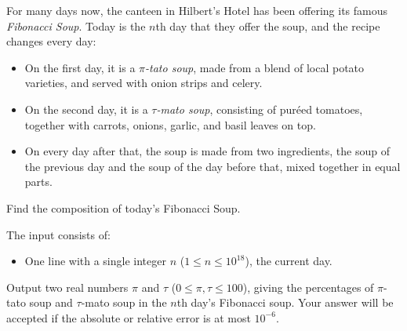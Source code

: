 
For many days now, the canteen in Hilbert's Hotel has been offering its famous
\emph{Fibonacci Soup}. Today is the $n$th day that they offer the soup, and the
recipe changes every day:

\begin{itemize}
  \item On the first day, it is a \emph{$\pi$-tato soup}, made from a blend of local
    potato varieties, and served with onion strips and celery.
  \item On the second day, it is a \emph{$\tau$-mato soup}, consisting of
    pur\'eed tomatoes, together with carrots, onions, garlic, and basil leaves on top.
\end{itemize}

\begin{itemize}
  \item On every day after that, the soup is made from two ingredients, the soup of the
    previous day and the soup of the day before that, mixed together in equal parts.
\end{itemize}

Find the composition of today's Fibonacci Soup.

\begin{Input}
  The input consists of:
  \begin{itemize}
    \item One line with a single integer $n$ ($1 \le n \le 10^{18}$), the current day.
  \end{itemize}
\end{Input}

\begin{Output}
  Output two real numbers $\pi$ and $\tau$ ($0 \le \pi,\tau \le 100$), giving
  the percentages of $\pi$-tato soup and $\tau$-mato soup in the $n$th day's
  Fibonacci soup. Your answer will be accepted if the absolute or relative
  error is at most $10^{-6}$.
\end{Output}
